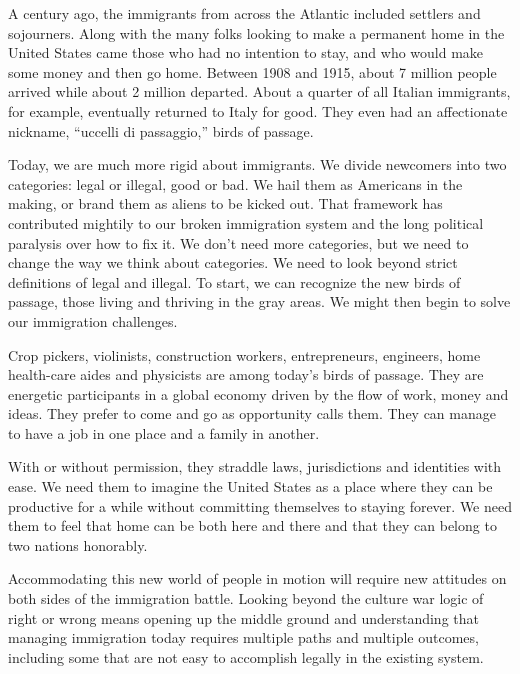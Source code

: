 A century ago, the immigrants from across the Atlantic included settlers and sojourners. Along with the many folks looking to make a permanent home in the United States came those who had no intention to stay, and who would make some money and then go home. Between 1908 and 1915, about 7 million people arrived while about 2 million departed. About a quarter of all Italian immigrants, for example, eventually returned to Italy for good. They even had an affectionate nickname, ``uccelli di passaggio,'' birds of passage.


Today, we are much more rigid about immigrants. We divide newcomers into two categories: legal or illegal, good or bad. We hail them as Americans in the making, or brand them as aliens to be kicked out. That framework has contributed mightily to our broken immigration system and the long political paralysis over how to fix it. We don't need more categories, but we need to change the way we think about categories. We need to look beyond strict definitions of legal and illegal. To start, we can recognize the new birds of passage, those living and thriving in the gray areas. We might then begin to solve our immigration challenges.


Crop pickers, violinists, construction workers, entrepreneurs, engineers, home health-care aides and physicists are among today's birds of passage. They are energetic participants in a global economy driven by the flow of work, money and ideas. They prefer to come and go as opportunity calls them. They can manage to have a job in one place and a family in another.


With or without permission, they straddle laws, jurisdictions and identities with ease. We need them to imagine the United States as a place where they can be productive for a while without committing themselves to staying forever. We need them to feel that home can be both here and there and that they can belong to two nations honorably.


Accommodating this new world of people in motion will require new attitudes on both sides of the immigration battle. Looking beyond the culture war logic of right or wrong means opening up the middle ground and understanding that managing immigration today requires multiple paths and multiple outcomes, including some that are not easy to accomplish legally in the existing system.


